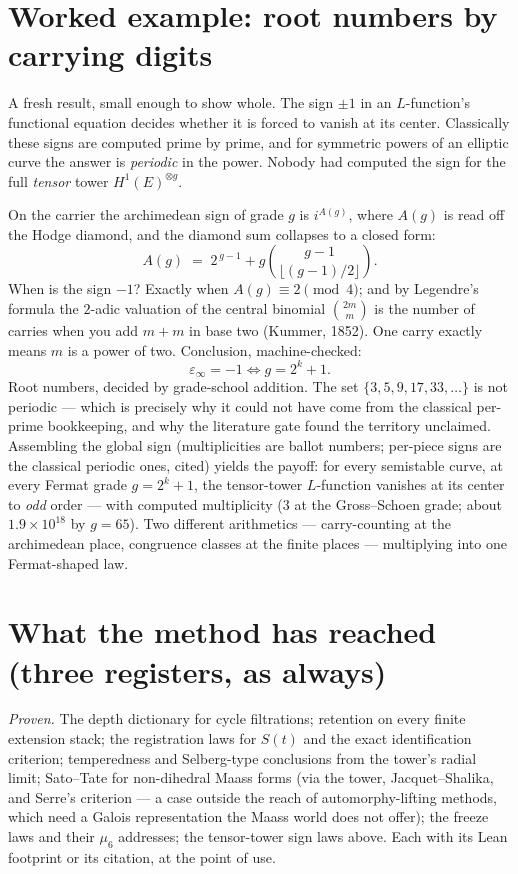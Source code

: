 \documentclass[11pt]{article}
\begin{document}
\section{Worked example: root numbers by carrying digits}

A fresh result, small enough to show whole.  The sign $\pm1$ in an $L$-function's
functional equation decides whether it is forced to vanish at its center.
Classically these signs are computed prime by prime, and for symmetric powers of
an elliptic curve the answer is \emph{periodic} in the power.  Nobody had computed
the sign for the full \emph{tensor} tower $H^1(E)^{\otimes g}$.

On the carrier the archimedean sign of grade $g$ is $i^{A(g)}$, where $A(g)$ is
read off the Hodge diamond, and the diamond sum collapses to a closed form:
\[
A(g)\;=\;2^{\,g-1}+g\binom{g-1}{\lfloor (g-1)/2\rfloor}.
\]
When is the sign $-1$?  Exactly when $A(g)\equiv2\pmod4$; and by Legendre's
formula the $2$-adic valuation of the central binomial $\binom{2m}m$ is the
number of carries when you add $m+m$ in base two (Kummer, 1852).  One carry
exactly means $m$ is a power of two.  Conclusion, machine-checked:
\[
\varepsilon_\infty=-1 \iff g=2^k+1 .
\]
Root numbers, decided by grade-school addition.  The set $\{3,5,9,17,33,\dots\}$
is not periodic --- which is precisely why it could not have come from the
classical per-prime bookkeeping, and why the literature gate found the territory
unclaimed.  Assembling the global sign (multiplicities are ballot numbers;
per-piece signs are the classical periodic ones, cited) yields the payoff: for
every semistable curve, at every Fermat grade $g=2^k+1$, the tensor-tower
$L$-function vanishes at its center to \emph{odd} order --- with computed
multiplicity ($3$ at the Gross--Schoen grade; about $1.9\times10^{18}$ by
$g=65$).  Two different arithmetics --- carry-counting at the archimedean place,
congruence classes at the finite places --- multiplying into one Fermat-shaped
law.

\section{What the method has reached (three registers, as always)}

\emph{Proven.}  The depth dictionary for cycle filtrations; retention on every
finite extension stack; the registration laws for $S(t)$ and the exact
identification criterion; temperedness and Selberg-type conclusions from the
tower's radial limit; Sato--Tate for non-dihedral Maass forms (via the tower,
Jacquet--Shalika, and Serre's criterion --- a case outside the reach of
automorphy-lifting methods, which need a Galois representation the Maass world
does not offer); the freeze laws and their $\mu_6$ addresses; the tensor-tower
sign laws above.  Each with its Lean footprint or its citation, at the point of
use.
\end{document}
